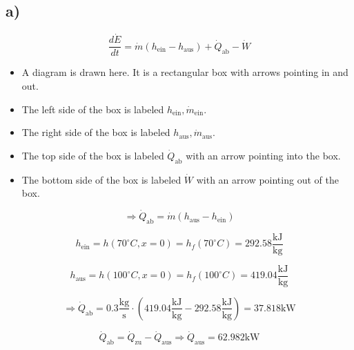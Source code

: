 

\subsection*{a)}

\[
\frac{d\dot{E}}{dt} = \dot{m} (h_{\text{ein}} - h_{\text{aus}}) + \dot{Q}_{\text{ab}} - \dot{W}
\]

\begin{itemize}
    \item A diagram is drawn here. It is a rectangular box with arrows pointing in and out.
    \item The left side of the box is labeled $h_{\text{ein}}, \dot{m}_{\text{ein}}$.
    \item The right side of the box is labeled $h_{\text{aus}}, \dot{m}_{\text{aus}}$.
    \item The top side of the box is labeled $\dot{Q}_{\text{ab}}$ with an arrow pointing into the box.
    \item The bottom side of the box is labeled $\dot{W}$ with an arrow pointing out of the box.
\end{itemize}

\[
\Rightarrow \dot{Q}_{\text{ab}} = \dot{m} (h_{\text{aus}} - h_{\text{ein}})
\]

\[
h_{\text{ein}} = h(70^\circ C, x=0) = h_f(70^\circ C) = 292.58 \frac{\text{kJ}}{\text{kg}}
\]

\[
h_{\text{aus}} = h(100^\circ C, x=0) = h_f(100^\circ C) = 419.04 \frac{\text{kJ}}{\text{kg}}
\]

\[
\Rightarrow \dot{Q}_{\text{ab}} = 0.3 \frac{\text{kg}}{\text{s}} \cdot \left( 419.04 \frac{\text{kJ}}{\text{kg}} - 292.58 \frac{\text{kJ}}{\text{kg}} \right) = 37.818 \text{kW}
\]

\[
\dot{Q}_{\text{ab}} = \dot{Q}_{\text{zu}} - \dot{Q}_{\text{aus}} \Rightarrow \dot{Q}_{\text{aus}} = 62.982 \text{kW}
\]